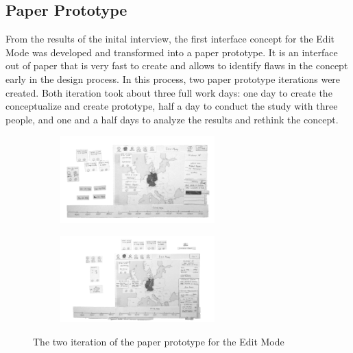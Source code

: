 

\subsection{Paper Prototype} %
\label{sub:paper_prototype}

From the results of the inital interview, the first interface concept for the Edit Mode was developed and transformed into a paper prototype. It is an interface out of paper that is very fast to create and allows to identify flaws in the concept early in the design process. In this process, two paper prototype iterations were created. Both iteration took about three full work days: one day to create the conceptualize and create prototype, half a day to conduct the study with three people, and one and a half days to analyze the results and rethink the concept.

\begin{figure}[H]
\centering
\begin{subfigure}{.5\textwidth}
  \centering
  \includegraphics[width=225px]{graphics/development/design_process/paper_prototype_1.png}
\end{subfigure}%
\begin{subfigure}{.5\textwidth}
  \centering
  \includegraphics[width=225px]{graphics/development/design_process/paper_prototype_2.png}
\end{subfigure}
\caption{The two iteration of the paper prototype for the Edit Mode}
\label{fig:paper_prototypes}
\end{figure}

